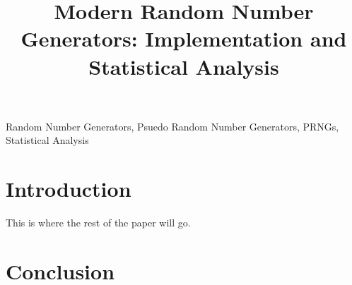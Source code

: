 \documentclass[conference,11pt]{IEEEtran}
\begin{document}
\title{Modern Random Number Generators: Implementation and Statistical Analysis}

\author{
\and
{}
\and
{}
}

\maketitle

\begin{abstract}

\end{abstract}

\begin{IEEEkeywords}
Random Number Generators, Psuedo Random Number Generators, PRNGs, Statistical Analysis
\end{IEEEkeywords}
\section{Introduction}
\label{sec:introduction}


This is where the rest of the paper will go. \cite{Matsumoto:1998:MTE:272991.272995}

\section{Conclusion}
\label{sec:conclusion}




\end{document}
